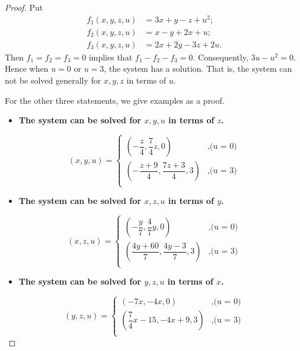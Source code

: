 \begin{Exercise}
	\begin{proof}
		Put
		\begin{align*}
		f_1(x,y,z,u) &= 3x+y-z+u^2; \\
		f_2(x,y,z,u) &= x-y+2x+u; \\
		f_3(x,y,z,u) &= 2x+2y-3z+2u.
		\end{align*}
		Then $f_1 = f_2 = f_3 = 0$ implies that $f_1 - f_2 - f_3 = 0$.
		Consequently, $3u - u^2 = 0$.
		Hence when $u = 0$ or $u = 3$, the system has a solution.
		That is, the system can not be solved generally for $x,y,z$ in terms of $u$.
		
		For the other three statements, we give examples as a proof.
		\begin{itemize}
			\item \textbf{The system can be solved for $x,y,u$ in terms of $z$.}
		\end{itemize}
		$$
		(x,y,u) = \begin{cases}
		\left( -\dfrac{z}{4}, \dfrac{7}{4}z, 0 \right) &, \mbox{(u = 0)}\\
		\left( -\dfrac{z+9}{4}, \dfrac{7z+3}{4}, 3 \right) &, \mbox{(u = 3)}\\
		\end{cases}
		$$
		
		\begin{itemize}
			\item \textbf{The system can be solved for $x,z,u$ in terms of $y$.}
		\end{itemize}
		$$
		(x,z,u) = \begin{cases}
		\left( -\dfrac{y}{7}, \dfrac{4}{7}y, 0 \right) &, \mbox{(u = 0)}\\
		\left( \dfrac{4y+60}{7}, \dfrac{4y-3}{7}, 3 \right) &, \mbox{(u = 3)}\\
		\end{cases}
		$$
		
		\begin{itemize}
			\item \textbf{The system can be solved for $y,z,u$ in terms of $x$.}
		\end{itemize}
		$$
		(y,z,u) = \begin{cases}
		\left( -7x, -4x, 0 \right) &, \mbox{(u = 0)}\\
		\left( \dfrac{7}{4}x-15, -4x+9, 3 \right) &, \mbox{(u = 3)}\\
		\end{cases}
		$$
	\end{proof}
	
\end{Exercise}